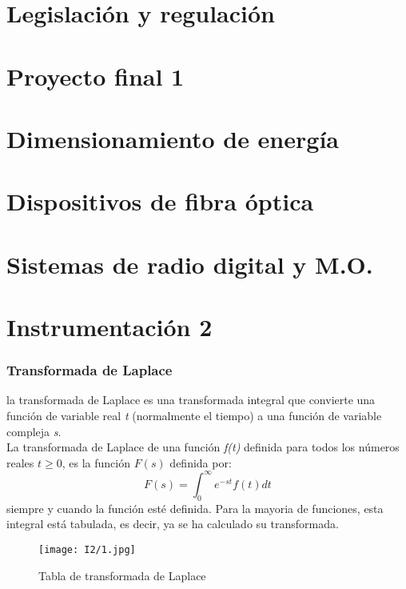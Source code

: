 \documentclass[12pt,fleqn,a4paper,oneside]{LegrandOrangeBook}
\begin{document}
\part{Legislación y regulación}

\part{Proyecto final 1}

\part{Dimensionamiento de energía}

\part{Dispositivos de fibra óptica}

\part{Sistemas de radio digital y M.O.}

\part{Instrumentación 2}
\section{Transformada de Laplace}
la transformada de Laplace es una transformada integral que convierte una función de variable real \textit{t} (normalmente el tiempo) a una función de variable compleja \textit{s}.\\
La transformada de Laplace de una función \textit{f(t)} definida para todos los números reales $t\geq 0$, es la función $F(s)$ definida por:
\begin{equation}
F(s)=\int_0^\infty e^{-st}f(t)dt
\end{equation}
siempre y cuando la función esté definida. Para la mayoria de funciones, esta integral está tabulada, es decir, ya se ha calculado su transformada.
\begin{figure}[H]
\centering
\texttt{[image: I2/1.jpg]}
\caption{Tabla de transformada de Laplace}
\label{fig:tabla de transformadas Laplace}
\end{figure}
\end{document}

